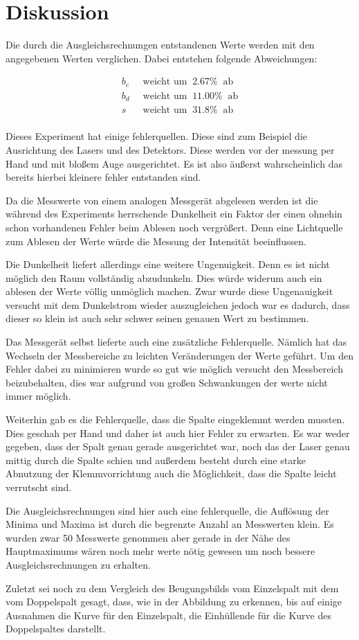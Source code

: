 \section{Diskussion}

Die durch die Ausgleichsrechnungen entstandenen Werte werden mit den angegebenen Werten verglichen. Dabei entstehen folgende Abweichungen:

\begin{align*}
b_e \; \; & \text{weicht um} \; \; 2.67\% \; \; \text{ab} \\
b_d \; \; & \text{weicht um} \; \; 11.00\% \; \; \text{ab} \\ 
s \; \; & \text{weicht um} \; \; 31.8\% \; \; \text{ab}  \\
\end{align*}

Dieses Experiment hat einige fehlerquellen. Diese sind zum Beispiel die Ausrichtung des Lasers und des Detektors. Diese werden vor der messung per Hand und mit bloßem Auge ausgerichtet. Es ist also äußerst wahrscheinlich das bereits hierbei kleinere fehler entstanden sind.

Da die Messwerte von einem analogen Messgerät abgelesen werden ist die während des Experiments herrschende Dunkelheit ein Faktor der einen ohnehin schon vorhandenen Fehler beim Ablesen noch vergrößert. Denn eine Lichtquelle zum Ablesen der Werte würde die Messung der Intensität beeinflussen.

Die Dunkelheit liefert allerdings eine weitere Ungenuigkeit. Denn es ist nicht möglich den Raum vollständig abzudunkeln. Dies würde widerum auch ein ablesen der Werte völlig unmöglich machen. Zwar wurde diese Ungenauigkeit versucht mit dem Dunkelstrom wieder auszugleichen jedoch war es dadurch, dass dieser so klein ist auch sehr schwer seinen genauen Wert zu bestimmen.

Das Messgerät selbst lieferte auch eine zusätzliche Fehlerquelle. Nämlich hat das Wechseln der Messbereiche zu leichten Veränderungen der Werte geführt. Um den Fehler dabei zu minimieren wurde so gut wie möglich versucht den Messbereich beizubehalten, dies war aufgrund von großen Schwankungen der werte nicht immer möglich.

Weiterhin gab es die Fehlerquelle, dass die Spalte eingeklemmt werden mussten. Dies geschah per Hand und daher ist auch hier Fehler zu erwarten. Es war weder gegeben, dass der Spalt genau gerade ausgerichtet war, noch das der Laser genau mittig durch die Spalte schien und außerdem besteht durch eine starke Abnutzung der Klemmvorrichtung auch die Möglichkeit, dass die Spalte leicht verrutscht sind.

Die Ausgleichsrechnungen sind hier auch eine fehlerquelle, die Auflösung der Minima und Maxima ist durch die begrenzte Anzahl an Messwerten klein. Es wurden zwar 50 Messwerte genommen aber gerade in der Nähe des Hauptmaximums wären noch mehr werte nötig gewesen um noch bessere Ausgleichsrechnungen zu erhalten.

Zuletzt sei noch zu dem Vergleich des Beugungsbilds vom Einzelspalt mit dem vom Doppelspalt gesagt, dass, wie in der Abbildung zu erkennen, bis auf einige Ausnahmen die Kurve für den Einzelspalt, die Einhüllende für die Kurve des Doppelspaltes darstellt.